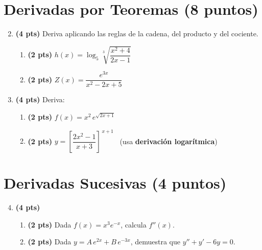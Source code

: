 \documentclass[12pt, letterpaper]{article}
\begin{document}
\section{Derivadas por Teoremas (8 puntos)}

\begin{enumerate}[leftmargin=*]
  \setcounter{enumi}{1}
  \item \textbf{(4 pts)} Deriva aplicando las reglas de la cadena, del producto y del cociente.
        \begin{enumerate}[label=\alph*)]
          \item \textbf{(2 pts)} $h(x) = \log_5\sqrt[3]{\dfrac{x^{2}+4}{2x-1}}$
          \item \textbf{(2 pts)} $Z(x) = \dfrac{e^{3x}}{x^{2}-2x+5}$
        \end{enumerate}

  \item \textbf{(4 pts)} Deriva:
        \begin{enumerate}[label=\alph*)]
          \item \textbf{(2 pts)} $f(x) = x^{2}\,e^{\sqrt{2x+1}}$
          \item \textbf{(2 pts)} $y = \left[\dfrac{2x^{2}-1}{x+3}\right]^{\,x+1}$ \ (usa \textbf{derivación logarítmica})
        \end{enumerate}
\end{enumerate}

\section{Derivadas Sucesivas (4 puntos)}

\begin{enumerate}[leftmargin=*]
  \setcounter{enumi}{3}
  \item \textbf{(4 pts)}
        \begin{enumerate}[label=\alph*)]
          \item \textbf{(2 pts)} Dada $f(x) = x^{3}e^{-x}$, calcula $f''(x)$.
          \item \textbf{(2 pts)} Dada $y = A\,e^{2x} + B\,e^{-3x}$, demuestra que $y'' + y' - 6y = 0$.
        \end{enumerate}
\end{enumerate}
\end{document}
